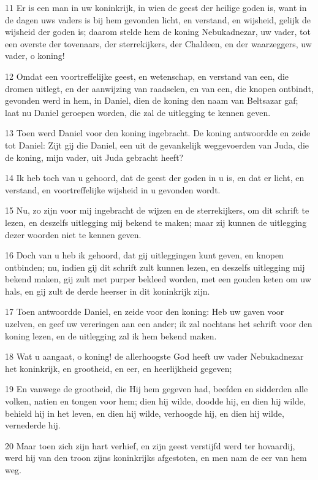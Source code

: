 \par 11 Er is een man in uw koninkrijk, in wien de geest der heilige goden is, want in de dagen uws vaders is bij hem gevonden licht, en verstand, en wijsheid, gelijk de wijsheid der goden is; daarom stelde hem de koning Nebukadnezar, uw vader, tot een overste der tovenaars, der sterrekijkers, der Chaldeen, en der waarzeggers, uw vader, o koning!
\par 12 Omdat een voortreffelijke geest, en wetenschap, en verstand van een, die dromen uitlegt, en der aanwijzing van raadselen, en van een, die knopen ontbindt, gevonden werd in hem, in Daniel, dien de koning den naam van Beltsazar gaf; laat nu Daniel geroepen worden, die zal de uitlegging te kennen geven.
\par 13 Toen werd Daniel voor den koning ingebracht. De koning antwoordde en zeide tot Daniel: Zijt gij die Daniel, een uit de gevankelijk weggevoerden van Juda, die de koning, mijn vader, uit Juda gebracht heeft?
\par 14 Ik heb toch van u gehoord, dat de geest der goden in u is, en dat er licht, en verstand, en voortreffelijke wijsheid in u gevonden wordt.
\par 15 Nu, zo zijn voor mij ingebracht de wijzen en de sterrekijkers, om dit schrift te lezen, en deszelfs uitlegging mij bekend te maken; maar zij kunnen de uitlegging dezer woorden niet te kennen geven.
\par 16 Doch van u heb ik gehoord, dat gij uitleggingen kunt geven, en knopen ontbinden; nu, indien gij dit schrift zult kunnen lezen, en deszelfs uitlegging mij bekend maken, gij zult met purper bekleed worden, met een gouden keten om uw hals, en gij zult de derde heerser in dit koninkrijk zijn.
\par 17 Toen antwoordde Daniel, en zeide voor den koning: Heb uw gaven voor uzelven, en geef uw vereringen aan een ander; ik zal nochtans het schrift voor den koning lezen, en de uitlegging zal ik hem bekend maken.
\par 18 Wat u aangaat, o koning! de allerhoogste God heeft uw vader Nebukadnezar het koninkrijk, en grootheid, en eer, en heerlijkheid gegeven;
\par 19 En vanwege de grootheid, die Hij hem gegeven had, beefden en sidderden alle volken, natien en tongen voor hem; dien hij wilde, doodde hij, en dien hij wilde, behield hij in het leven, en dien hij wilde, verhoogde hij, en dien hij wilde, vernederde hij.
\par 20 Maar toen zich zijn hart verhief, en zijn geest verstijfd werd ter hovaardij, werd hij van den troon zijns koninkrijks afgestoten, en men nam de eer van hem weg.
